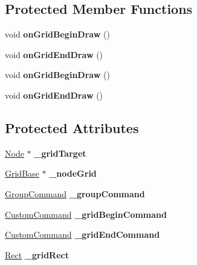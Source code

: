 \subsection*{Protected Member Functions}
\begin{DoxyCompactItemize}
\item 
\mbox{\label{classNodeGrid_ad80d65eb1f7ef76fbdb0d56227eb8b9b}} 
void {\bfseries on\+Grid\+Begin\+Draw} ()
\item 
\mbox{\label{classNodeGrid_a6b26488e7931f920b266f2bae93f1e97}} 
void {\bfseries on\+Grid\+End\+Draw} ()
\item 
\mbox{\label{classNodeGrid_ad80d65eb1f7ef76fbdb0d56227eb8b9b}} 
void {\bfseries on\+Grid\+Begin\+Draw} ()
\item 
\mbox{\label{classNodeGrid_a6b26488e7931f920b266f2bae93f1e97}} 
void {\bfseries on\+Grid\+End\+Draw} ()
\end{DoxyCompactItemize}
\subsection*{Protected Attributes}
\begin{DoxyCompactItemize}
\item 
\mbox{\label{classNodeGrid_a142e52427277704bcec5037a6d59c2b1}} 
\hyperlink{classNode}{Node} $\ast$ {\bfseries \+\_\+grid\+Target}
\item 
\mbox{\label{classNodeGrid_aafa0bb7fcd9004107a9a0778d802242d}} 
\hyperlink{classGridBase}{Grid\+Base} $\ast$ {\bfseries \+\_\+node\+Grid}
\item 
\mbox{\label{classNodeGrid_ac8e1c8ef5b5354d904473c33e49e2d39}} 
\hyperlink{classGroupCommand}{Group\+Command} {\bfseries \+\_\+group\+Command}
\item 
\mbox{\label{classNodeGrid_a605d4a4a4099cc11ac7ae3f27a116041}} 
\hyperlink{classCustomCommand}{Custom\+Command} {\bfseries \+\_\+grid\+Begin\+Command}
\item 
\mbox{\label{classNodeGrid_ae915d80451f6e1a28046663e64443e90}} 
\hyperlink{classCustomCommand}{Custom\+Command} {\bfseries \+\_\+grid\+End\+Command}
\item 
\mbox{\label{classNodeGrid_a63fa1a35af58f5b2dd97c310f0b1aec8}} 
\hyperlink{classRect}{Rect} {\bfseries \+\_\+grid\+Rect}
\end{DoxyCompactItemize}
